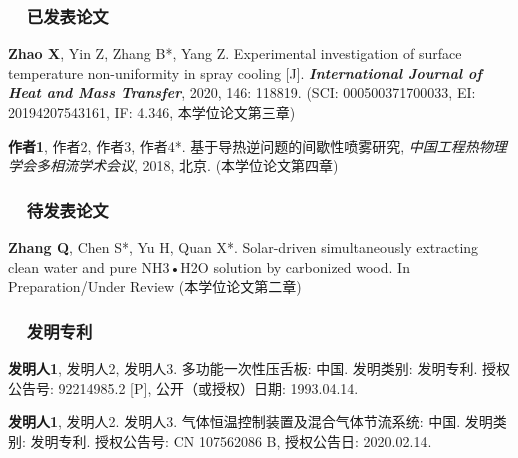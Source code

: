 
\begin{publications}
	\subsubsection*{\textbf{~~已发表论文}}
	\vspace{-10pt}
	\begin{enumerate}[label={[\arabic*]}]
		\item\textbf{Zhao X}, Yin Z, Zhang B*, Yang Z. Experimental investigation of surface temperature non-uniformity in spray cooling [J]. \textbf{\textsl{International Journal of Heat and Mass Transfer}}, 2020, 146: 118819. (SCI: 000500371700033, EI: 20194207543161, IF: 4.346, 本学位论文第三章) 
		\item\textbf{作者1}, 作者2, 作者3, 作者4*. 基于导热逆问题的间歇性喷雾研究, \textit{中国工程热物理学会多相流学术会议}, 2018, 北京. (本学位论文第四章)
	\end{enumerate}
	\subsubsection*{\textbf{~~待发表论文}}
	\vspace{-10pt}
	\begin{enumerate}[label={[\arabic*]}]
		\item\textbf{Zhang Q}, Chen S*, Yu H, Quan X*. Solar-driven simultaneously extracting clean water and pure NH3•H2O solution by carbonized wood. In Preparation/Under Review (本学位论文第二章)
	\end{enumerate}
	\subsubsection*{\textbf{~~发明专利}}
	\vspace{-10pt}
	\begin{enumerate}[label={[\arabic*]}]
		\item\textbf{发明人1}, 发明人2, 发明人3. 多功能一次性压舌板: 中国. 发明类别: 发明专利. 授权公告号: 92214985.2 [P], 公开（或授权）日期: 1993.04.14.
		\item\textbf{发明人1}, 发明人2. 发明人3. 气体恒温控制装置及混合气体节流系统: 中国. 发明类别: 发明专利. 授权公告号: CN 107562086 B, 授权公告日: 2020.02.14.
	\end{enumerate}	

\end{publications}
